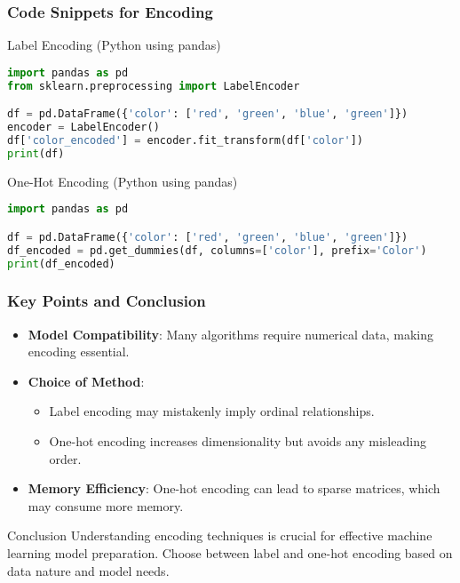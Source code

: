 \documentclass[aspectratio=169]{beamer}
\begin{document}
\begin{frame}[fragile]
    \frametitle{Code Snippets for Encoding}
    \begin{block}{Label Encoding (Python using pandas)}
        \begin{lstlisting}[language=Python]
import pandas as pd
from sklearn.preprocessing import LabelEncoder

df = pd.DataFrame({'color': ['red', 'green', 'blue', 'green']})
encoder = LabelEncoder()
df['color_encoded'] = encoder.fit_transform(df['color'])
print(df)
        \end{lstlisting}
    \end{block}
    
    \begin{block}{One-Hot Encoding (Python using pandas)}
        \begin{lstlisting}[language=Python]
import pandas as pd

df = pd.DataFrame({'color': ['red', 'green', 'blue', 'green']})
df_encoded = pd.get_dummies(df, columns=['color'], prefix='Color')
print(df_encoded)
        \end{lstlisting}
    \end{block}
\end{frame}

\begin{frame}[fragile]
    \frametitle{Key Points and Conclusion}
    \begin{itemize}
        \item \textbf{Model Compatibility}: Many algorithms require numerical data, making encoding essential.
        \item \textbf{Choice of Method}:
            \begin{itemize}
                \item Label encoding may mistakenly imply ordinal relationships.
                \item One-hot encoding increases dimensionality but avoids any misleading order.
            \end{itemize}
        \item \textbf{Memory Efficiency}: One-hot encoding can lead to sparse matrices, which may consume more memory.
    \end{itemize}

    \begin{block}{Conclusion}
        Understanding encoding techniques is crucial for effective machine learning model preparation. Choose between label and one-hot encoding based on data nature and model needs.
    \end{block}
\end{frame}
\end{document}
